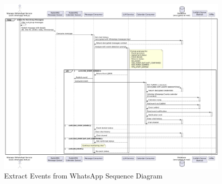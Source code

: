 \begin{figure}[!h]
  \centering
  \includegraphics[width=\textwidth]{images/docs/diagrams/sequence-diagrams/all-sequence-diagrams/Extract Events from WhatsApp.png}
  \caption{Extract Events from WhatsApp Sequence Diagram}
  \label{fig:seq/extract-events-whatsapp}
\end{figure}
